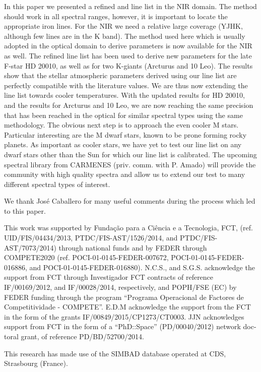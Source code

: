\documentclass{aa}
\begin{document}
In this paper we presented a refined  and  line list in
the NIR domain. The method should work in all spectral ranges, however, it is
important to locate the appropriate iron lines. For the NIR we need a relative
large coverage (YJHK, although few lines are in the K band). The method used
here which is usually adopted in the optical domain to derive parameters is now
available for the NIR as well. The refined line list has been used to derive new
parameters for the late F-star HD 20010, as well as for two K-giants (Arcturus
and 10 Leo). The results show that the stellar atmospheric parameters derived
using our line list are perfectly compatible with the literature values. We are
thus now extending the line list towards cooler temperatures. With the updated
results for HD 20010, and the results for Arcturus and 10 Leo, we are now
reaching the same precision that has been reached in the optical for similar
spectral types using the same methodology. The obvious next step is to approach
the even cooler M stars. Particular interesting are the M dwarf stars, known to
be prone forming rocky planets. As important as cooler stars, we have yet to
test our line list on any dwarf stars other than the Sun for which our line list
is calibrated. The upcoming spectral library from CARMENES (priv. comm. with P.
Amado) will provide the community with high quality spectra and allow us to
extend our test to many different spectral types of interest.



\begin{acknowledgements}

We thank Jos\'e Caballero for many useful comments during the process which
led to this paper.

This work was supported by Funda\c{c}\~ao para a Ci\^encia e a Tecnologia, FCT,
(ref. UID/FIS/04434/2013, PTDC/FIS-AST/1526/2014, and PTDC/FIS-AST/7073/2014)
through national funds and by FEDER through COMPETE2020 (ref.
POCI-01-0145-FEDER-007672, POCI-01-0145-FEDER-016886, and
POCI-01-0145-FEDER-016880). N.C.S., and S.G.S. acknowledge the support from FCT
through Investigador FCT contracts of reference IF/00169/2012, and
IF/00028/2014, respectively, and POPH/FSE (EC) by FEDER funding through the
program “Programa Operacional de Factores de Competitividade - COMPETE”. E.D.M
acknowledge the support from the FCT in the form of the grants
IF/00849/2015/CP1273/CT0003. JJN acknowledges support from FCT in the form of a
“PhD::Space” (PD/00040/2012) network doc- toral grant, of reference
PD/BD/52700/2014.

This research has made use of the SIMBAD database operated at CDS, Strasbourg
(France).

\end{acknowledgements}
\end{document}
